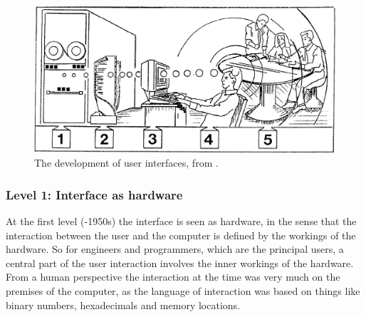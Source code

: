\begin{figure}[h]
	\centering
  		\includegraphics[width=0.9\linewidth]{figures/foci-interface}
	\caption[The development of user interfaces \citep{grudin1990computer}.]
   {The development of user interfaces, from \citep{grudin1990computer}.}
   \label{foci-interface}
\end{figure}

\subsubsection{Level 1: Interface as hardware}
At the first level (-1950s) the interface is seen as hardware, in the sense that the interaction between the user and the computer is defined by the workings of the hardware.
So for engineers and programmers, which are the principal users, a central part of the user interaction involves the inner workings of the hardware.
From a human perspective the interaction at the time was very much on the premises of the computer, as the language of interaction was based on things like binary numbers, hexadecimals and memory locations.

